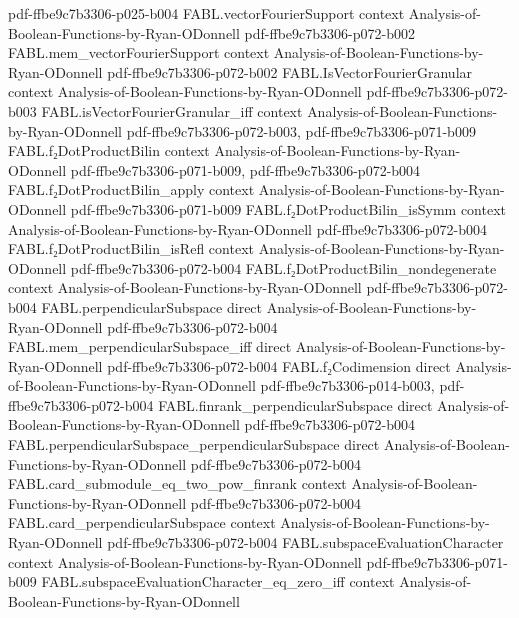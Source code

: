 \begin{theorem}
  {pdf-ffbe9c7b3306-p025-b004}
\proofstep
  {FABL.vectorFourierSupport}
  {context}
  {Analysis-of-Boolean-Functions-by-Ryan-ODonnell}
  {pdf-ffbe9c7b3306-p072-b002}
\proofstep
  {FABL.mem_vectorFourierSupport}
  {context}
  {Analysis-of-Boolean-Functions-by-Ryan-ODonnell}
  {pdf-ffbe9c7b3306-p072-b002}
\proofstep
  {FABL.IsVectorFourierGranular}
  {context}
  {Analysis-of-Boolean-Functions-by-Ryan-ODonnell}
  {pdf-ffbe9c7b3306-p072-b003}
\proofstep
  {FABL.isVectorFourierGranular_iff}
  {context}
  {Analysis-of-Boolean-Functions-by-Ryan-ODonnell}
  {pdf-ffbe9c7b3306-p072-b003,
    pdf-ffbe9c7b3306-p071-b009}
\proofstep
  {FABL.f₂DotProductBilin}
  {context}
  {Analysis-of-Boolean-Functions-by-Ryan-ODonnell}
  {pdf-ffbe9c7b3306-p071-b009,
    pdf-ffbe9c7b3306-p072-b004}
\proofstep
  {FABL.f₂DotProductBilin_apply}
  {context}
  {Analysis-of-Boolean-Functions-by-Ryan-ODonnell}
  {pdf-ffbe9c7b3306-p071-b009}
\proofstep
  {FABL.f₂DotProductBilin_isSymm}
  {context}
  {Analysis-of-Boolean-Functions-by-Ryan-ODonnell}
  {pdf-ffbe9c7b3306-p072-b004}
\proofstep
  {FABL.f₂DotProductBilin_isRefl}
  {context}
  {Analysis-of-Boolean-Functions-by-Ryan-ODonnell}
  {pdf-ffbe9c7b3306-p072-b004}
\proofstep
  {FABL.f₂DotProductBilin_nondegenerate}
  {context}
  {Analysis-of-Boolean-Functions-by-Ryan-ODonnell}
  {pdf-ffbe9c7b3306-p072-b004}
\proofstep
  {FABL.perpendicularSubspace}
  {direct}
  {Analysis-of-Boolean-Functions-by-Ryan-ODonnell}
  {pdf-ffbe9c7b3306-p072-b004}
\proofstep
  {FABL.mem_perpendicularSubspace_iff}
  {direct}
  {Analysis-of-Boolean-Functions-by-Ryan-ODonnell}
  {pdf-ffbe9c7b3306-p072-b004}
\proofstep
  {FABL.f₂Codimension}
  {direct}
  {Analysis-of-Boolean-Functions-by-Ryan-ODonnell}
  {pdf-ffbe9c7b3306-p014-b003,
    pdf-ffbe9c7b3306-p072-b004}
\proofstep
  {FABL.finrank_perpendicularSubspace}
  {direct}
  {Analysis-of-Boolean-Functions-by-Ryan-ODonnell}
  {pdf-ffbe9c7b3306-p072-b004}
\proofstep
  {FABL.perpendicularSubspace_perpendicularSubspace}
  {direct}
  {Analysis-of-Boolean-Functions-by-Ryan-ODonnell}
  {pdf-ffbe9c7b3306-p072-b004}
\proofstep
  {FABL.card_submodule_eq_two_pow_finrank}
  {context}
  {Analysis-of-Boolean-Functions-by-Ryan-ODonnell}
  {pdf-ffbe9c7b3306-p072-b004}
\proofstep
  {FABL.card_perpendicularSubspace}
  {context}
  {Analysis-of-Boolean-Functions-by-Ryan-ODonnell}
  {pdf-ffbe9c7b3306-p072-b004}
\proofstep
  {FABL.subspaceEvaluationCharacter}
  {context}
  {Analysis-of-Boolean-Functions-by-Ryan-ODonnell}
  {pdf-ffbe9c7b3306-p071-b009}
\proofstep
  {FABL.subspaceEvaluationCharacter_eq_zero_iff}
  {context}
  {Analysis-of-Boolean-Functions-by-Ryan-ODonnell}

\end{theorem}
